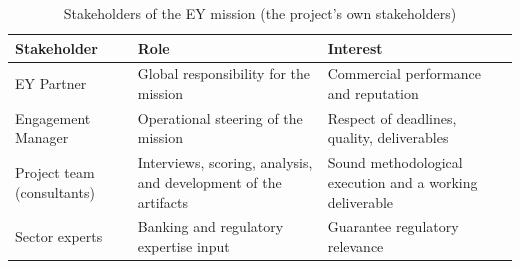 \begin{table}[H]
\centering
\caption{Stakeholders of the EY mission (the project's own stakeholders)} \label{tab:stakeholders-ey}

\footnotesize
\setlength{\tabcolsep}{4pt}
\begin{tabular}{|p{3.0cm}|p{4.6cm}|p{6.9cm}|}
\hline
\textbf{Stakeholder} & \textbf{Role} & \textbf{Interest} \\
\hline
EY Partner & Global responsibility for the mission & Commercial performance and reputation \\
\hline
Engagement Manager & Operational steering of the mission & Respect of deadlines, quality, deliverables \\
\hline
Project team (consultants) & Interviews, scoring, analysis, and development of the artifacts & Sound methodological execution and a working deliverable \\
\hline
Sector experts & Banking and regulatory expertise input & Guarantee regulatory relevance \\
\hline
\end{tabular}

\end{table}

